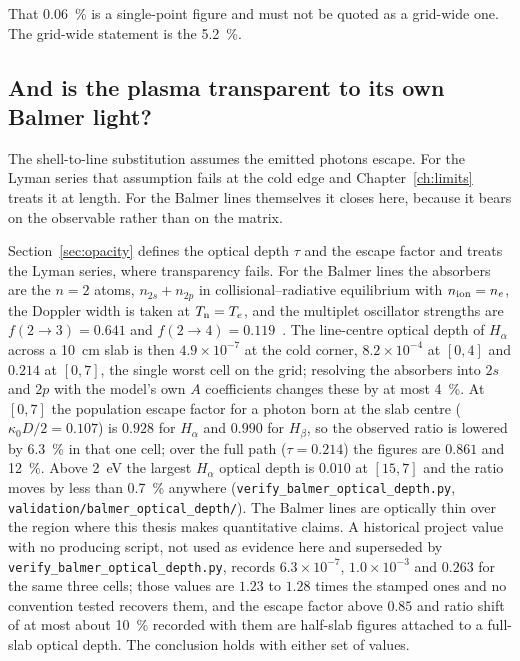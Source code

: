 That \SI{0.06}{\percent} is a single-point figure and must not be quoted as a
grid-wide one. The grid-wide statement is the \SI{5.2}{\percent}.

\subsection{And is the plasma transparent to its own Balmer light?}

The shell-to-line substitution assumes the emitted photons escape. For the
Lyman series that assumption fails at the cold edge and
Chapter~\ref{ch:limits} treats it at length. For the Balmer lines themselves it
closes here, because it bears on the observable rather than on the matrix.

Section~\ref{sec:opacity} defines the optical depth $\tau$ and the escape factor
and treats the Lyman series, where transparency fails. For the Balmer lines the
absorbers are the $n=2$ atoms, $n_{2s}+n_{2p}$ in collisional--radiative
equilibrium with $n_{\mathrm{ion}}=n_e$, the Doppler width is taken at $T_{\mathrm{n}}=T_e$, and the
multiplet oscillator strengths are $f(2\to3)=0.641$ and
$f(2\to4)=0.119$~\cite{WieseFuhr2009}. The line-centre optical depth of
$H_\alpha$ across a \SI{10}{\centi\metre} slab is then $4.9\times10^{-7}$ at the
cold corner, $8.2\times10^{-4}$ at $[0,4]$ and $0.214$ at $[0,7]$, the single
worst cell on the grid; resolving the absorbers into $2s$ and $2p$ with the
model's own $A$ coefficients changes these by at most \SI{4}{\percent}. At
$[0,7]$ the population escape factor for a photon born at the slab centre
($\kappa_0 D/2 = 0.107$) is $0.928$ for $H_\alpha$ and $0.990$ for $H_\beta$, so
the observed ratio is lowered by \SI{6.3}{\percent} in that one cell; over the
full path ($\tau=0.214$) the figures are $0.861$ and \SI{12}{\percent}. Above
\SI{2}{\electronvolt} the largest $H_\alpha$ optical depth is $0.010$ at
$[15,7]$ and the ratio moves by less than \SI{0.7}{\percent} anywhere
(\texttt{verify\_balmer\_optical\_depth.py},
\texttt{validation/balmer\_optical\_depth/}). The Balmer lines are optically
thin over the region where this thesis makes quantitative claims. A historical
project value with no producing script, not used as evidence here and superseded
by \texttt{verify\_balmer\_optical\_depth.py}, records
$6.3\times10^{-7}$, $1.0\times10^{-3}$ and $0.263$ for the same three cells;
those values are $1.23$ to $1.28$ times the stamped ones and no convention
tested recovers them, and the escape factor above $0.85$ and ratio shift of at
most about \SI{10}{\percent} recorded with them are half-slab figures attached
to a full-slab optical depth. The conclusion holds with either set of values.

